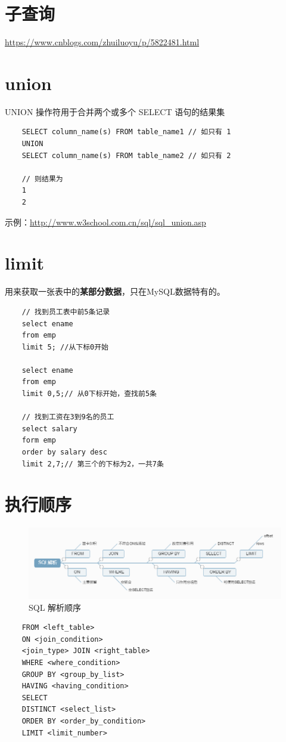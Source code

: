\documentclass[UTF8,a4paper,12pt]{ctexbook}
\begin{document}
	\section{子查询}
		\url{https://www.cnblogs.com/zhuiluoyu/p/5822481.html}
	
	\section{union}
		UNION 操作符用于合并两个或多个 SELECT 语句的结果集
		
		\begin{lstlisting}
	SELECT column_name(s) FROM table_name1 // 如只有 1
	UNION
	SELECT column_name(s) FROM table_name2 // 如只有 2
	
	// 则结果为
	1
	2
		\end{lstlisting}	
		
		示例：\url{http://www.w3school.com.cn/sql/sql_union.asp}
			
	\section{limit}		
		用来获取一张表中的\textbf{某部分数据}，只在MySQL数据特有的。
		\begin{lstlisting}
	// 找到员工表中前5条记录
	select ename 
	from emp 
	limit 5; //从下标0开始
	
	select ename
	from emp
	limit 0,5;// 从0下标开始，查找前5条
	
	// 找到工资在3到9名的员工
	select salary 
	form emp
	order by salary desc 
	limit 2,7;// 第三个的下标为2，一共7条
		\end{lstlisting}
	
	
	\section{执行顺序}
		\begin{figure}[H]
			\centering
			\includegraphics[scale=.6]{sqlProcess}
			\caption{SQL 解析顺序}
		\end{figure}
		
		\begin{lstlisting}
	FROM <left_table>
	ON <join_condition>
	<join_type> JOIN <right_table>
	WHERE <where_condition>
	GROUP BY <group_by_list>
	HAVING <having_condition>
	SELECT 
	DISTINCT <select_list>
	ORDER BY <order_by_condition>
	LIMIT <limit_number>
		\end{lstlisting}
		
\end{document}
